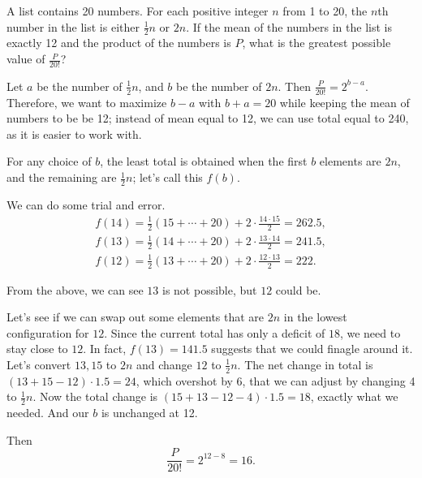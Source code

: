 \documentclass[11pt,twoside]{scrartcl}
\begin{document}
\begin{problem}
    A list contains 20 numbers. For each positive integer $ n $ from 1 to 20, the $ n $th number in the list is either $ \frac{1}{2}n $ or $ 2n $. If the mean of the numbers in the list is exactly 12 and the product of the numbers is $ P $, what is the greatest possible value of $ \frac{P}{20!} $?
    \begin{sketch}
        Let $a$ be the number of $\frac{1}{2}n$, and $b$ be the number of $2n$. Then $\frac{P}{20!} = 2^{b-a}$. Therefore, we want to maximize $b-a$ with $b+a=20$ while keeping the mean of numbers to be be 12; instead of mean equal to 12, we can use total equal to 240, as it is easier to work with.

        For any choice of $b$, the least total is obtained when the first $b$ elements are $2n$, and the remaining are $\frac{1}{2}n$; let's call this $f(b)$.

        We can do some trial and error. 
        \begin{align*}
            f(14) = \frac{1}{2}(15+\cdots+20) + 2 \cdot \frac{14\cdot15}{2} = 262.5, \\
            f(13) = \frac{1}{2}(14+\cdots+20) + 2 \cdot \frac{13\cdot14}{2} = 241.5, \\
            f(12) = \frac{1}{2}(13+\cdots+20) + 2 \cdot \frac{12\cdot13}{2} = 222.
        \end{align*}

        From the above, we can see $13$ is not possible, but $12$ could be.

        Let's see if we can swap out some elements that are $2n$ in the lowest configuration for $12$. Since the current total has only a deficit of $18$, we need to stay close to $12$. In fact, $f(13)=141.5$ suggests that we could finagle around it. Let's convert $13, 15$ to $2n$ and change $12$ to $\frac{1}{2}n$. The net change in total is $(13+15-12)\cdot1.5 = 24$, which overshot by 6, that we can adjust by changing 4 to $\frac{1}{2}n$. Now the total change is $(15+13-12-4)\cdot1.5=18$, exactly what we needed. And our $b$ is unchanged at 12.

        Then 
        \[ \frac{P}{20!} = 2^{12-8} = \boxed{16}. \]

    \end{sketch}
\end{problem}
\end{document}
